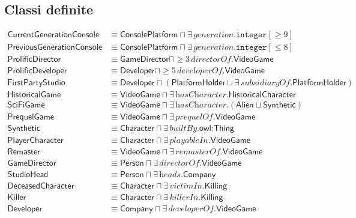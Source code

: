 \subsection*{Classi definite}
\begingroup\small\begin{align*}
\textsf{CurrentGenerationConsole} &\equiv \textsf{ConsolePlatform} \sqcap \exists\,\textit{generation}.\texttt{integer}[\geq 9] \\
\textsf{PreviousGenerationConsole} &\equiv \textsf{ConsolePlatform} \sqcap \exists\,\textit{generation}.\texttt{integer}[\leq 8] \\
\textsf{ProlificDirector} &\equiv \textsf{GameDirector} \sqcap {\geq}3\,\textit{directorOf}.\textsf{VideoGame} \\
\textsf{ProlificDeveloper} &\equiv \textsf{Developer} \sqcap {\geq}5\,\textit{developerOf}.\textsf{VideoGame} \\
\textsf{FirstPartyStudio} &\equiv \textsf{Developer} \sqcap (\textsf{PlatformHolder} \sqcup \exists\,\textit{subsidiaryOf}.\textsf{PlatformHolder}) \\
\textsf{HistoricalGame} &\equiv \textsf{VideoGame} \sqcap \exists\,\textit{hasCharacter}.\textsf{HistoricalCharacter} \\
\textsf{SciFiGame} &\equiv \textsf{VideoGame} \sqcap \exists\,\textit{hasCharacter}.(\textsf{Alien} \sqcup \textsf{Synthetic}) \\
\textsf{PrequelGame} &\equiv \textsf{VideoGame} \sqcap \exists\,\textit{prequelOf}.\textsf{VideoGame} \\
\textsf{Synthetic} &\equiv \textsf{Character} \sqcap \exists\,\textit{builtBy}.\textsf{owl:Thing} \\
\textsf{PlayerCharacter} &\equiv \textsf{Character} \sqcap \exists\,\textit{playableIn}.\textsf{VideoGame} \\
\textsf{Remaster} &\equiv \textsf{VideoGame} \sqcap \exists\,\textit{remasterOf}.\textsf{VideoGame} \\
\textsf{GameDirector} &\equiv \textsf{Person} \sqcap \exists\,\textit{directorOf}.\textsf{VideoGame} \\
\textsf{StudioHead} &\equiv \textsf{Person} \sqcap \exists\,\textit{heads}.\textsf{Company} \\
\textsf{DeceasedCharacter} &\equiv \textsf{Character} \sqcap \exists\,\textit{victimIn}.\textsf{Killing} \\
\textsf{Killer} &\equiv \textsf{Character} \sqcap \exists\,\textit{killerIn}.\textsf{Killing} \\
\textsf{Developer} &\equiv \textsf{Company} \sqcap \exists\,\textit{developerOf}.\textsf{VideoGame} \\

\end{align*}
